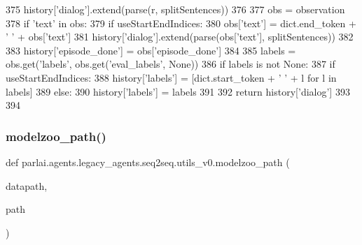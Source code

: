 \begin{DoxyCode}
375             history[\textcolor{stringliteral}{'dialog'}].extend(parse(r, splitSentences))
376 
377     obs = observation
378     \textcolor{keywordflow}{if} \textcolor{stringliteral}{'text'} \textcolor{keywordflow}{in} obs:
379         \textcolor{keywordflow}{if} useStartEndIndices:
380             obs[\textcolor{stringliteral}{'text'}] = dict.end\_token + \textcolor{stringliteral}{' '} + obs[\textcolor{stringliteral}{'text'}]
381         history[\textcolor{stringliteral}{'dialog'}].extend(parse(obs[\textcolor{stringliteral}{'text'}], splitSentences))
382 
383     history[\textcolor{stringliteral}{'episode\_done'}] = obs[\textcolor{stringliteral}{'episode\_done'}]
384 
385     labels = obs.get(\textcolor{stringliteral}{'labels'}, obs.get(\textcolor{stringliteral}{'eval\_labels'}, \textcolor{keywordtype}{None}))
386     \textcolor{keywordflow}{if} labels \textcolor{keywordflow}{is} \textcolor{keywordflow}{not} \textcolor{keywordtype}{None}:
387         \textcolor{keywordflow}{if} useStartEndIndices:
388             history[\textcolor{stringliteral}{'labels'}] = [dict.start\_token + \textcolor{stringliteral}{' '} + l \textcolor{keywordflow}{for} l \textcolor{keywordflow}{in} labels]
389         \textcolor{keywordflow}{else}:
390             history[\textcolor{stringliteral}{'labels'}] = labels
391 
392     \textcolor{keywordflow}{return} history[\textcolor{stringliteral}{'dialog'}]
393 
394 
\end{DoxyCode}
\mbox{\label{namespaceparlai_1_1agents_1_1legacy__agents_1_1seq2seq_1_1utils__v0_a5fbd3301b67f00d6d146fb01c7cd7626}} 
\subsubsection{\texorpdfstring{modelzoo\+\_\+path()}{modelzoo\_path()}}
{\footnotesize\ttfamily def parlai.\+agents.\+legacy\+\_\+agents.\+seq2seq.\+utils\+\_\+v0.\+modelzoo\+\_\+path (\begin{DoxyParamCaption}\item[{}]{datapath,  }\item[{}]{path }\end{DoxyParamCaption})}

